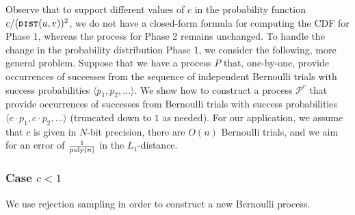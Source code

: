 Observe that to support different values of $c$ in the probability function $c/(\texttt{\textsc{dist}}(u,v))^2$, we do not have a closed-form formula for computing the CDF for Phase 1, whereas the process for Phase 2 remains unchanged. To handle the change in the probability distribution Phase 1, we consider the following, more general problem. Suppose that we have a process $P$ that, one-by-one, provide occurrences of successes from the sequence of independent Bernoulli trials with success probabilities $\langle p_1, p_2, \ldots \rangle$. We show how to construct a process $\mathcal{P}^c$ that provide occurrences of successes from Bernoulli trials with success probabilities $\langle c\cdot p_1, c\cdot p_2, \ldots\rangle$ (truncated down to $1$ as needed). For our application, we assume that $c$ is given in $N$-bit precision, there are $O(n)$ Bernoulli trials, and we aim for an error of $\frac{1}{\mathrm{poly}(n)}$ in the $L_1$-distance.

\subsubsection{Case $c < 1$}
We use rejection sampling in order to construct a new Bernoulli process.


